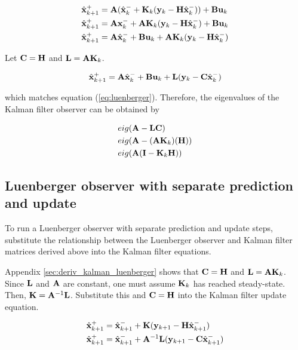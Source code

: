 \begin{align*}
  \hat{\mathbf{x}}_{k+1}^+ &= \mathbf{A}(\hat{\mathbf{x}}_k^- + \mathbf{K}_k(\mathbf{y}_k -
    \mathbf{H}\hat{\mathbf{x}}_k^-)) + \mathbf{B}\mathbf{u}_k \\
  \hat{\mathbf{x}}_{k+1}^+ &= \mathbf{A}\mathbf{x}_k^- + \mathbf{A}\mathbf{K}_k(\mathbf{y}_k -
    \mathbf{H}\hat{\mathbf{x}}_k^-) + \mathbf{B}\mathbf{u}_k \\
  \hat{\mathbf{x}}_{k+1}^+ &= \mathbf{A}\hat{\mathbf{x}}_k^- + \mathbf{B}\mathbf{u}_k +
    \mathbf{A}\mathbf{K}_k(\mathbf{y}_k - \mathbf{H}\hat{\mathbf{x}}_k^-)
\end{align*}

Let $\mathbf{C} = \mathbf{H}$ and $\mathbf{L} = \mathbf{A} \mathbf{K}_k$.

\begin{equation} \label{eq:app_kalman_leunberger}
  \hat{\mathbf{x}}_{k+1}^+ = \mathbf{A}\hat{\mathbf{x}}_k^- + \mathbf{B}\mathbf{u}_k + \mathbf{L}
    (\mathbf{y}_k - \mathbf{C}\hat{\mathbf{x}}_k^-)
\end{equation}

which matches equation (\ref{eq:luenberger}). Therefore, the eigenvalues of the
Kalman filter \gls{observer} can be obtained by

\begin{align}
  &eig(\mathbf{A} - \mathbf{L}\mathbf{C}) \nonumber \\
  &eig(\mathbf{A} - (\mathbf{A}\mathbf{K}_k)(\mathbf{H})) \nonumber \\
  &eig(\mathbf{A}(\mathbf{I} - \mathbf{K}_k\mathbf{H}))
\end{align}

\subsection{Luenberger observer with separate prediction and update}
\label{subsec:deriv_luenberger_separate}

To run a Luenberger \gls{observer} with separate prediction and update steps,
substitute the relationship between the Luenberger \gls{observer} and Kalman
filter matrices derived above into the Kalman filter equations.

Appendix \ref{sec:deriv_kalman_luenberger} shows that $\mathbf{C} = \mathbf{H}$ and
$\mathbf{L} = \mathbf{A}\mathbf{K}_k$. Since $\mathbf{L}$ and $\mathbf{A}$ are constant, one
must assume $\mathbf{K}_k$ has reached steady-state. Then,
$\mathbf{K} = \mathbf{A}^{-1}\mathbf{L}$. Substitute this and $\mathbf{C} = \mathbf{H}$ into
the Kalman filter update equation.

\begin{align*}
  \hat{\mathbf{x}}_{k+1}^+ &= \hat{\mathbf{x}}_{k+1}^- + \mathbf{K}(\mathbf{y}_{k+1} -
    \mathbf{H}\hat{\mathbf{x}}_{k+1}^-) \\
  \hat{\mathbf{x}}_{k+1}^+ &= \hat{\mathbf{x}}_{k+1}^- + \mathbf{A}^{-1}\mathbf{L}
    (\mathbf{y}_{k+1} - \mathbf{C}\hat{\mathbf{x}}_{k+1}^-)
\end{align*}

